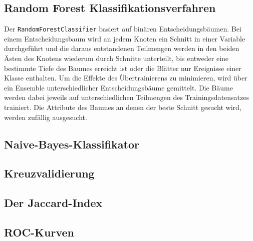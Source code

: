 \subsection{Random Forest Klassifikationsverfahren}
Der \texttt{RandomForestClassifier} basiert auf binären Entscheidungsbäumen.
Bei einem Entscheidungsbaum wird an jedem Knoten ein Schnitt in einer Variable durchgeführt und die daraus entstandenen Teilmengen 
werden in den beiden Ästen des Knotens wiederum durch Schnitte unterteilt, bis entweder eine bestimmte Tiefe
des Baumes erreicht ist oder die Blätter nur Ereignisse einer Klasse enthalten. Um die Effekte des Übertrainierens zu minimieren, wird über ein Ensemble unterschiedlicher
Entscheidungsbäume gemittelt.
Die Bäume werden dabei jeweils auf unterschiedlichen Teilmengen des Trainingsdatensatzes trainiert.
Die Attribute des Baumes an denen der beste Schnitt gesucht wird, werden zufällig ausgesucht.

\subsection{Naive-Bayes-Klassifikator}

\subsection{Kreuzvalidierung}

\subsection{Der Jaccard-Index}

\subsection{ROC-Kurven}